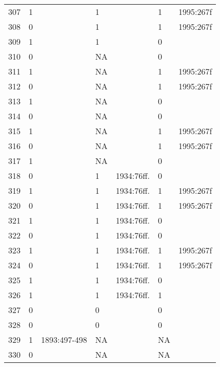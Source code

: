 {\begin{longtable}{p{.04\linewidth}p{.1\linewidth}p{.16\linewidth}p{.08\linewidth}p{.16\linewidth}p{.08\linewidth}p{.16\linewidth}}
307 & 1 &  & 1 &  & 1 & 1995:267f\\
308 & 0 &  & 1 &  & 1 & 1995:267f\\
309 & 1 &  & 1 &  & 0 & \\
310 & 0 &  & NA &  & 0 & \\
311 & 1 &  & NA &  & 1 & 1995:267f\\
312 & 0 &  & NA &  & 1 & 1995:267f\\
313 & 1 &  & NA &  & 0 & \\
314 & 0 &  & NA &  & 0 & \\
315 & 1 &  & NA &  & 1 & 1995:267f\\
316 & 0 &  & NA &  & 1 & 1995:267f\\
317 & 1 &  & NA &  & 0 & \\
318 & 0 &  & 1 & 1934:76ff. & 0 & \\
319 & 1 &  & 1 & 1934:76ff. & 1 & 1995:267f\\
320 & 0 &  & 1 & 1934:76ff. & 1 & 1995:267f\\
321 & 1 &  & 1 & 1934:76ff. & 0 & \\
322 & 0 &  & 1 & 1934:76ff. & 0 & \\
323 & 1 &  & 1 & 1934:76ff. & 1 & 1995:267f\\
324 & 0 &  & 1 & 1934:76ff. & 1 & 1995:267f\\
325 & 1 &  & 1 & 1934:76ff. & 0 & \\
326 & 1 &  & 1 & 1934:76ff. & 1 & \\
327 & 0 &  & 0 &  & 0 & \\
328 & 0 &  & 0 &  & 0 & \\
329 & 1 & 1893:497-498 & NA &  & NA & \\
330 & 0 &  & NA &  & NA & \\
\end{longtable}
}